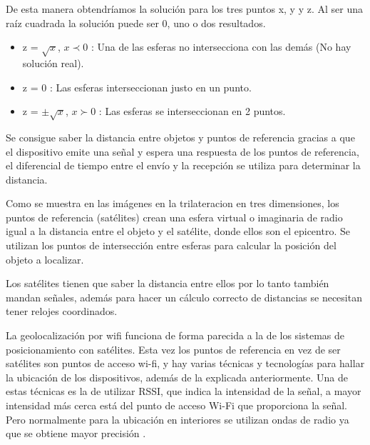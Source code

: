 De esta manera obtendríamos la solución para los tres puntos x, y y z. Al ser una raíz cuadrada la solución puede ser 0, uno o dos resultados.

\begin{itemize}
\item 
	z = $\sqrt{x}$, $x \prec 0$ : Una de las esferas no intersecciona con las demás (No hay solución real).
\item 
	z = 0 : Las esferas interseccionan justo en un punto.
\item 
	z = $\pm\sqrt{x}$, $x \succ 0$ : Las esferas se interseccionan en 2 puntos.
	
\end{itemize}

Se consigue saber la distancia entre objetos y puntos de referencia gracias a que el dispositivo emite una señal y espera una respuesta de los puntos de referencia, el diferencial de tiempo entre el envío y la recepción se utiliza para determinar la distancia.

Como se muestra en las imágenes en la trilateracion en tres dimensiones, los puntos de referencia (satélites) crean una esfera virtual o imaginaria de radio igual a la distancia entre el objeto y el satélite, donde ellos son el epicentro. Se utilizan los puntos de intersección entre esferas para calcular la posición del objeto a localizar.

Los satélites tienen que saber la distancia entre ellos por lo tanto también mandan señales, además para hacer un cálculo correcto de distancias se necesitan tener relojes coordinados.
\\





La geolocalización por wifi funciona de forma parecida a la de los sistemas de posicionamiento con satélites. Esta vez los puntos de referencia en vez de ser satélites son puntos de acceso wi-fi, y hay varias técnicas y tecnologías para hallar la ubicación de los dispositivos, además de la explicada anteriormente. Una de estas técnicas es la de utilizar RSSI, que indica la intensidad de la señal, a mayor intensidad más cerca está del punto de acceso Wi-Fi que proporciona la señal.  Pero normalmente para la ubicación en interiores se utilizan ondas de radio ya que se obtiene mayor precisión \cite{wifiloc}. 


